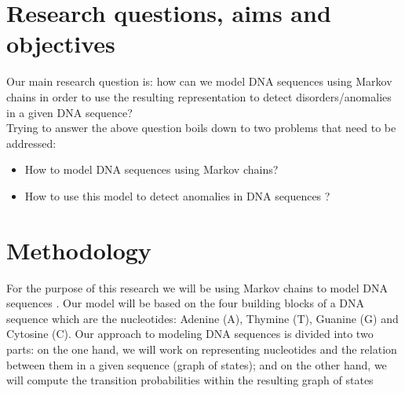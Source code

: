 \documentclass[10pt,twocolumn,letterpaper]{article}
\begin{document}
\section{Research questions, aims and objectives}
 {
    Our main research question is: how can we model DNA sequences using Markov chains in order 
    to use the resulting representation to detect disorders/anomalies in a given DNA sequence?\\
    Trying to answer the above question boils down to two problems that need to be addressed:
    \begin{itemize}
        \item How to model DNA sequences using Markov chains?
        \item How to use this model to detect anomalies in DNA sequences \cite{scientific_american}?
    \end{itemize}

 }

\section{Methodology}
 {
    For the purpose of this research we will be using Markov chains to model DNA sequences \cite{singh}. Our model will be based on the four building blocks of a DNA sequence which are the nucleotides: Adenine (A), Thymine (T),
    Guanine (G) and Cytosine (C).
    Our approach to modeling DNA sequences is divided into two parts: on the one hand, we will work on representing nucleotides and the relation between them in a given sequence (graph of states); and on the other hand, we will compute the transition probabilities within the resulting graph of states
 }



 {\small
  
  
 }
\end{document}
